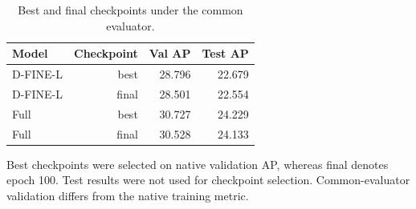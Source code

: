 \begin{table}[t]
\centering
\small
\setlength{\tabcolsep}{4pt}
\caption{Best and final checkpoints under the common evaluator.}
\label{tab:selected-s2}
\begin{tabular}{lrrr}
\toprule
Model & Checkpoint & Val AP & Test AP \\
\midrule
D-FINE-L & best & 28.796 & 22.679 \\
D-FINE-L & final & 28.501 & 22.554 \\
Full & best & 30.727 & 24.229 \\
Full & final & 30.528 & 24.133 \\
\bottomrule
\end{tabular}
\par\smallskip
\begin{minipage}{0.97\textwidth}\footnotesize Best checkpoints were selected on native validation AP, whereas final denotes epoch 100. Test results were not used for checkpoint selection. Common-evaluator validation differs from the native training metric.\end{minipage}
\par\medskip
\end{table}
